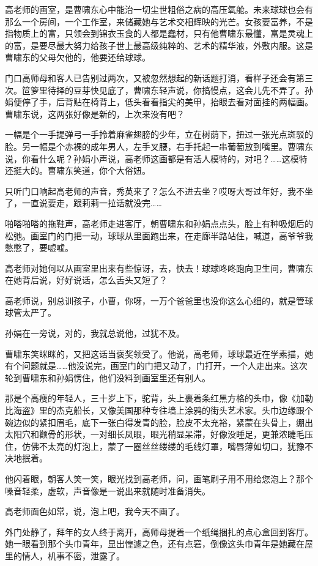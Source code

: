 \documentclass[lang=cn,newtx,12pt,scheme=chinese]{elegantbook}
\begin{document}
高老师的画室，是曹啸东心中能治一切尘世粗俗之病的高压氧舱。未来球球也会有那么一个房间，一个工作室，来储藏她与艺术交相辉映的光芒。女孩要富养，不是指物质上的富，只领会到锦衣玉食的人都是蠢材，只有他曹啸东最懂，富是灵魂上的富，是要尽最大努力给孩子世上最高级纯粹的、艺术的精华液，外敷内服。这是曹啸东的父母欠他的，他要还给球球。

门口高师母和客人已告别过两次，又被忽然想起的新话题打消，看样子还会有第三次。笸箩里待择的豆芽快见底了，曹啸东轻声说，你搞慢点，这会儿先不弄了。孙娟便停了手，后背贴在椅背上，低头看看指尖的美甲，抬眼去看对面挂的两幅画。曹啸东说，这两张好像是新的，上次来没有吧？

一幅是个一手提弹弓一手拎着麻雀翅膀的少年，立在树荫下，扭过一张光点斑驳的脸。另一幅是个赤裸的成年男人，左手叉腰，右手托起一串葡萄放到嘴里。曹啸东说，你看什么呢？孙娟小声说，高老师这画都是有活人模特的，对吧？……这模特还挺大的。曹啸东笑道，你个大俗妞。

只听门口响起高老师的声音，秀英来了？怎么不进去坐？哎呀大哥过年好，我不坐了，一直说要走，跟莉莉一拉话就没完……

啪嗒啪嗒的拖鞋声，高老师走进客厅，朝曹啸东和孙娟点点头，脸上有种吸烟后的松弛。画室门的门把一动，球球从里面跑出来，在走廊半路站住，喊道，高爷爷我憋憋了，要嘘嘘。

高老师对她何以从画室里出来有些惊讶，去，快去！球球咚咚跑向卫生间，曹啸东在她背后说，好好说话，怎么舌头又短了？

高老师说，别总训孩子，小曹，你呀，一万个爸爸里也没你这么心细的，就是管球球管太严了。

孙娟在一旁说，对的，我就总说他，过犹不及。

曹啸东笑眯眯的，又把这话当褒奖领受了。他说，高老师，球球最近在学素描，她有个问题就是……他没说完，画室门的门把又动了，门打开，一个人走出来。这次轮到曹啸东和孙娟愣住，他们没料到画室里还有别人。

那是个高瘦的年轻人，三十岁上下，驼背，头上裹着条红黑方格的头巾，像《加勒比海盗》里的杰克船长，又像美国那种专往墙上涂鸦的街头艺术家。头巾边缘跟个碗边似的紧扣眉毛，底下一张白得发青的脸，脸皮不太充裕，紧蒙在头骨上，绷出太阳穴和颧骨的形状，一对细长凤眼，眼光稍显呆滞，好像没睡足，更兼浓睫毛压住，仿佛不太亮的灯泡上，蒙了一圈丝丝缕缕的毛线灯罩，嘴唇薄如切口，犹豫不决地抿着。

他闪着眼，朝客人笑一笑，眼光找到高老师，问，画笔刷子用不用给您泡上？那个嗓音轻柔，虚软，声音像是一说出来就随时准备消失。

高老师面色如常，说，泡上吧，我今天不画了。

外门处静了，拜年的女人终于离开，高师母提着一个纸绳捆扎的点心盒回到客厅。她一眼看到那个头巾青年，显出惶遽之色，还有点窘，倒像这头巾青年是她藏在屋里的情人，机事不密，泄露了。
\end{document}
